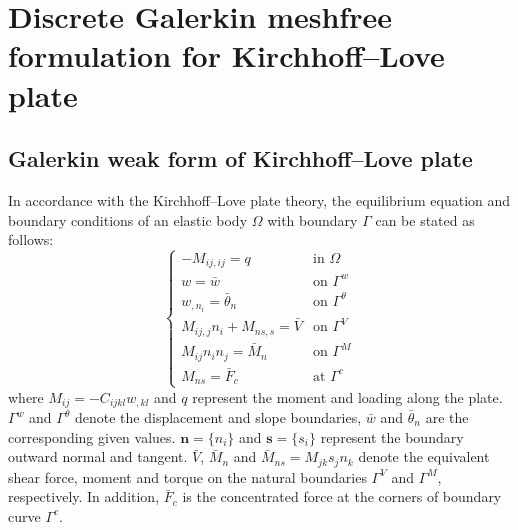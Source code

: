 \section{Discrete Galerkin meshfree formulation for Kirchhoff--Love plate}\label{sec:formulation}

\subsection{Galerkin weak form of Kirchhoff--Love plate}

In accordance with the Kirchhoff--Love plate theory, the equilibrium equation and boundary conditions of an elastic body $\Omega$ with boundary $\Gamma$ can be stated as follows:
\begin{equation}\label{eq:1}
\begin{cases}
-M_{ij,ij}=q & \text{in }\Omega\\[2pt]
w=\bar{w} & \text{on }\Gamma^{w}\\[2pt]
w_{,n_i}=\bar{\theta}_{n} & \text{on }\Gamma^{\theta}\\[2pt]
M_{ij,j}n_i+M_{ns,s}=\bar{V} & \text{on }\Gamma^{V}\\[2pt]
M_{ij}n_in_j=\bar{M}_{n} & \text{on }\Gamma^{M}\\[2pt]
M_{ns}=\bar{F}_{c} & \text{at }\Gamma^{c}
\end{cases}
\end{equation}
where $M_{ij}=-C_{ijkl}w_{,kl}$ and $q$ represent the moment and loading along the plate.
$\Gamma^{w}$ and $\Gamma^{\theta}$ denote the displacement and slope boundaries, $\bar{w}$ and $\bar{\theta}_{n}$ are the corresponding given values.
$\bm{n}=\{n_i\}$ and $\bm{s}=\{s_i\}$ represent the boundary outward normal and tangent.
$\bar{V}$, $\bar{M}_{n}$ and $\bar{M}_{ns}=M_{jk}s_jn_k$ denote the equivalent shear force, moment and torque on the natural boundaries $\Gamma^{V}$ and $\Gamma^{M}$, respectively.
In addition, $\bar{F}_{c}$ is the concentrated force at the corners of boundary curve $\Gamma^{c}$.

